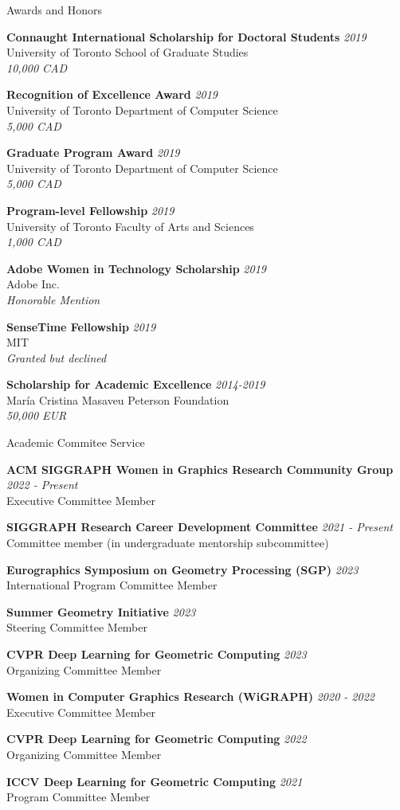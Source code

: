 \documentclass{resume}
\newcommand{\cvitembig}[4]{
    {\bf #1} \hfill {\em \small #2} \\ 
    {\small#3 }\\
    {\it \small #4}
}
\newcommand{\cvitem}[3]{
    {\bf #1} \hfill {\em \small #2} \\ 
    {\small#3 }
}
\begin{document}
\begin{rSection}{Awards and Honors}
\cvitembig{Connaught International Scholarship for Doctoral Students}{2019}{University of Toronto School of Graduate Studies}{10,000 CAD}

\cvitembig{Recognition of Excellence Award}{2019}{University of Toronto Department of Computer Science}{5,000 CAD}

\cvitembig{Graduate Program Award}{2019}{University of Toronto Department of Computer Science}{5,000 CAD}

\cvitembig{Program-level Fellowship}{2019}{University of Toronto Faculty of Arts and Sciences}{1,000 CAD}

\cvitembig{Adobe Women in Technology Scholarship}{2019}{Adobe Inc.}{Honorable Mention}

\cvitembig{SenseTime Fellowship}{2019}{MIT}{Granted but declined}


\cvitembig{ Scholarship for Academic Excellence}{2014-2019}{Mar\'{i}a Cristina Masaveu Peterson Foundation}{50,000 EUR}

\end{rSection}

\begin{rSection}{Academic Commitee Service}

\cvitem{ACM SIGGRAPH Women in Graphics Research Community Group}{2022 - Present}{Executive Committee Member}

\cvitem{SIGGRAPH Research Career Development Committee}{2021 - Present}{Committee member (in undergraduate mentorship subcommittee)}

\cvitem{Eurographics Symposium on Geometry Processing (SGP)}{2023}{International Program Committee Member}

\cvitem{Summer Geometry Initiative}{2023}{Steering Committee Member}

\cvitem{CVPR Deep Learning for Geometric Computing}{2023}{Organizing Committee Member}

\cvitem{Women in Computer Graphics Research (WiGRAPH)}{2020 - 2022}{Executive Committee Member}

\cvitem{CVPR Deep Learning for Geometric Computing}{2022}{Organizing Committee Member}

\cvitem{ICCV Deep Learning for Geometric Computing}{2021}{Program Committee Member}

\end{rSection}
\end{document}
